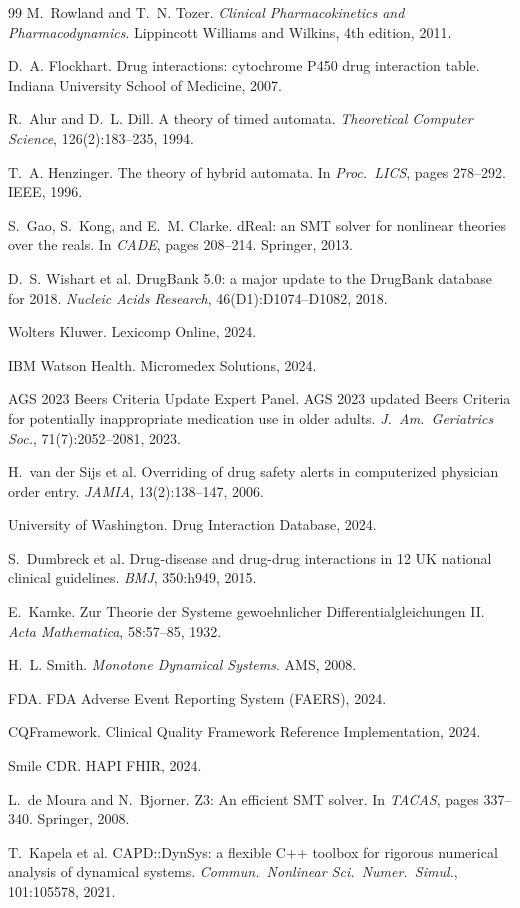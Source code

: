 \documentclass{article}
\theoremstyle{definition}
\begin{document}
\begin{thebibliography}{99}
M.~Rowland and T.~N. Tozer.
\emph{Clinical Pharmacokinetics and Pharmacodynamics}.
Lippincott Williams and Wilkins, 4th edition, 2011.

D.~A. Flockhart.
Drug interactions: cytochrome P450 drug interaction table.
Indiana University School of Medicine, 2007.

R.~Alur and D.~L. Dill.
A theory of timed automata.
\emph{Theoretical Computer Science}, 126(2):183--235, 1994.

T.~A. Henzinger.
The theory of hybrid automata.
In \emph{Proc.\ LICS}, pages 278--292. IEEE, 1996.

S.~Gao, S.~Kong, and E.~M. Clarke.
dReal: an SMT solver for nonlinear theories over the reals.
In \emph{CADE}, pages 208--214. Springer, 2013.

D.~S. Wishart et al.
DrugBank 5.0: a major update to the DrugBank database for 2018.
\emph{Nucleic Acids Research}, 46(D1):D1074--D1082, 2018.

Wolters Kluwer.
Lexicomp Online, 2024.

IBM Watson Health.
Micromedex Solutions, 2024.

AGS 2023 Beers Criteria Update Expert Panel.
AGS 2023 updated Beers Criteria for potentially inappropriate medication use in older adults.
\emph{J.\ Am.\ Geriatrics Soc.}, 71(7):2052--2081, 2023.

H.~van der Sijs et al.
Overriding of drug safety alerts in computerized physician order entry.
\emph{JAMIA}, 13(2):138--147, 2006.

University of Washington.
Drug Interaction Database, 2024.

S.~Dumbreck et al.
Drug-disease and drug-drug interactions in 12 UK national clinical guidelines.
\emph{BMJ}, 350:h949, 2015.

E.~Kamke.
Zur Theorie der Systeme gewoehnlicher Differentialgleichungen II.
\emph{Acta Mathematica}, 58:57--85, 1932.

H.~L. Smith.
\emph{Monotone Dynamical Systems}.
AMS, 2008.

FDA.
FDA Adverse Event Reporting System (FAERS), 2024.

CQFramework.
Clinical Quality Framework Reference Implementation, 2024.

Smile CDR.
HAPI FHIR, 2024.

L.~de Moura and N.~Bjorner.
Z3: An efficient SMT solver.
In \emph{TACAS}, pages 337--340. Springer, 2008.

T.~Kapela et al.
CAPD::DynSys: a flexible C++ toolbox for rigorous numerical analysis of dynamical systems.
\emph{Commun.\ Nonlinear Sci.\ Numer.\ Simul.}, 101:105578, 2021.

\end{thebibliography}
\end{document}

